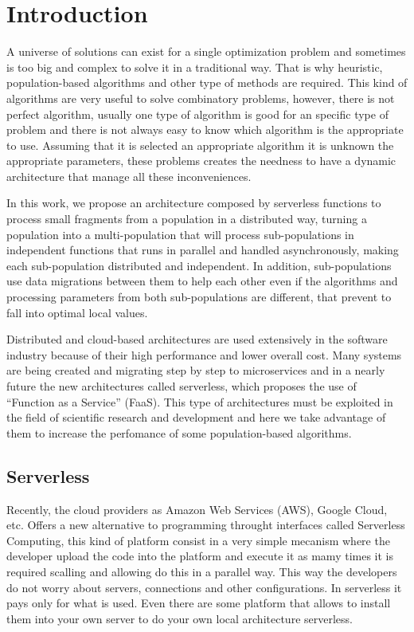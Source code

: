 \documentclass[runningheads]{llncs}
\begin{document}
\section{Introduction}
A universe of solutions can exist for a single optimization problem and sometimes
is too big and complex to solve it in a traditional way. That is why heuristic,
population-based algorithms and other type of methods are required. %
This kind of algorithms are very useful to solve combinatory problems,
however, there is not perfect algorithm, usually one type of algorithm is good for an specific
type of problem and there is not always easy to know which algorithm is the appropriate to use.
Assuming that it is selected an appropriate algorithm it is unknown the appropriate parameters,
these problems creates the needness to have a dynamic architecture that manage all these inconveniences.%

In this work, we propose an architecture composed by serverless functions to
process small fragments from a population in a distributed way,
turning a population into a multi-population that will process sub-populations in independent
functions that runs in parallel and handled asynchronously, making
each sub-population distributed and independent. In addition, sub-populations use data
migrations between them to help each other even if the algorithms and processing parameters from both sub-populations are different, 
that prevent to fall into optimal local values. %

Distributed and cloud-based architectures are used extensively in the software
industry because of their high performance and lower overall cost.  Many systems
are being created and migrating step by step to microservices and in a nearly
future the new architectures called serverless, which proposes the use of
“Function as a Service” (FaaS). This type of architectures must be exploited 
in the field of scientific research and development and here we take advantage of them
to increase the perfomance of some population-based algorithms.

\subsection{Serverless}
Recently, the cloud providers as Amazon Web Services (AWS), Google Cloud, etc.
Offers a new alternative to programming throught interfaces called Serverless
Computing, this kind of platform consist in a very simple mecanism where the
developer upload the code into the platform and execute it as mamy times it is
required scalling and allowing do this in a parallel way. This way the
developers do not worry about servers, connections and other configurations. In
serverless it pays only for what is used. Even there are some platform that
allows to install them into your own server to do your own local architecture
serverless.
\end{document}
